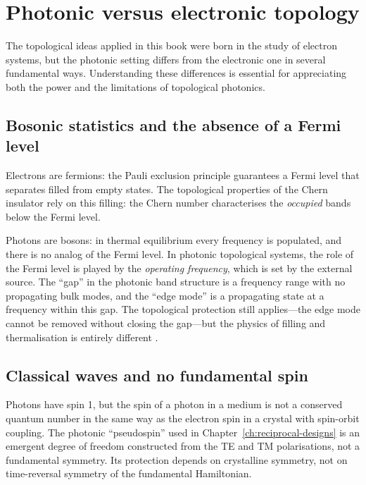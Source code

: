 \section{Photonic versus electronic topology}
\label{sec:ch1-photonic-vs-electronic}

The topological ideas applied in this book were born in the study of
electron systems, but the photonic setting differs from the electronic
one in several fundamental ways.  Understanding these differences is
essential for appreciating both the power and the limitations of
topological photonics.

\subsection{Bosonic statistics and the absence of a Fermi level}
\label{sec:ch1-bosonic}

Electrons are fermions: the Pauli exclusion principle guarantees a
Fermi level that separates filled from empty states.  The topological
properties of the Chern insulator rely on this filling: the Chern
number characterises the \emph{occupied} bands below the Fermi level.

Photons are bosons: in thermal equilibrium every frequency is populated,
and there is no analog of the Fermi level.  In photonic topological
systems, the role of the Fermi level is played by the \emph{operating
frequency}, which is set by the external source.  The ``gap'' in the
photonic band structure is a frequency range with no propagating bulk
modes, and the ``edge mode'' is a propagating state at a frequency
within this gap.  The topological protection still applies---the edge
mode cannot be removed without closing the gap---but the physics of
filling and thermalisation is entirely different
\cite{ozawa2018topological}.

\subsection{Classical waves and no fundamental spin}
\label{sec:ch1-classical}

Photons have spin 1, but the spin of a photon in a medium is not a
conserved quantum number in the same way as the electron spin in a
crystal with spin-orbit coupling.  The photonic ``pseudospin'' used in
Chapter~\ref{ch:reciprocal-designs} is an emergent degree of freedom
constructed from the TE and TM polarisations, not a fundamental
symmetry.  Its protection depends on crystalline symmetry, not on
time-reversal symmetry of the fundamental Hamiltonian.

